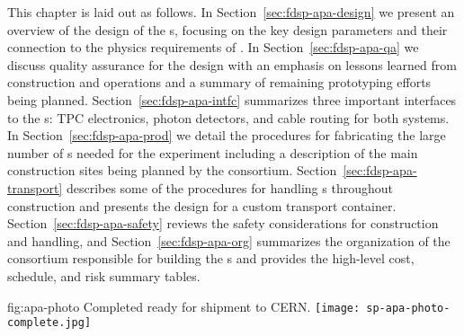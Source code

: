 This chapter is laid out as follows.  In Section~\ref{sec:fdsp-apa-design} we present an overview of the design of the s, focusing on the key design parameters and their connection to the physics requirements of .  In Section~\ref{sec:fdsp-apa-qa} we discuss quality assurance for the design with an emphasis on lessons learned from  construction and operations and a summary of remaining prototyping efforts being planned. Section~\ref{sec:fdsp-apa-intfc} summarizes three important interfaces to the s: TPC electronics, photon detectors, and cable routing for both systems.  In Section~\ref{sec:fdsp-apa-prod} we detail the procedures for fabricating the large number of s needed for the experiment including a description of the main construction sites being planned by the  consortium.  Section~\ref{sec:fdsp-apa-transport} describes some of the procedures for handling s throughout construction and presents the design for a custom transport container. Section~\ref{sec:fdsp-apa-safety} reviews the safety considerations for  construction and handling, and Section~\ref{sec:fdsp-apa-org} summarizes the organization of the  consortium responsible for building the s and provides the high-level cost, schedule, and risk summary tables. 

\begin{dunefigure}{fig:apa-photo}
{Completed   ready for shipment to CERN.}
\texttt{[image: sp-apa-photo-complete.jpg]}
\end{dunefigure}
